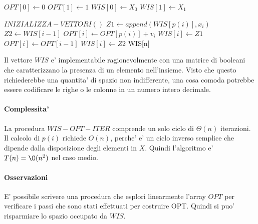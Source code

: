 \begin{algorithm}
    \begin{algorithmic}
            \State $OPT[0] \gets 0$
            \State $OPT[1] \gets 1$
            \State $WIS[0] \gets X_0$
            \State $WIS[1] \gets X_1$
        \EndProcedure
    \end{algorithmic}
\end{algorithm}

\begin{algorithm}
    \begin{algorithmic}
            \State $INIZIALIZZA-VETTORI()$
                \State $Z1 \gets append(WIS[p(i)], x_i)$
                \State $Z2 \gets WIS[i-1]$
                    \State $OPT[i] \gets OPT[p(i)] + v_i$
                    \State $WIS[i] \gets Z1$
                \Else
                    \State $OPT[i] \gets OPT[i-1]$
                    \State $WIS[i] \gets Z2$
                \EndIf
            \EndFor
            \State \Return WIS[n]
        \EndProcedure
    \end{algorithmic}
\end{algorithm}

Il vettore $WIS$ e' implementabile ragionevolmente con una matrice di booleani che caratterizzano la presenza di un elemento nell'insieme. Visto che questo richiederebbe una quantita' di spazio non indifferente, una cosa comoda potrebbe essere codificare le righe o le colonne in un numero intero decimale.

\paragraph{Complessita'}

La procedura $WIS-OPT-ITER$ comprende un solo ciclo di $\Theta(n)$ iterazioni.
Il calcolo di $p(i)$ richiede $O(n)$, perche' e' un ciclo inverso semplice che dipende dalla disposizione degli elementi in $X$.
Quindi l'algoritmo e' $T(n) = \O(n^2)$ nel caso medio.

\paragraph{Osservazioni}

E' possibile scrivere una procedura che esplori linearmente l'array $OPT$ per verificare i passi che sono stati effettuati per costruire OPT. Quindi si puo' risparmiare lo spazio occupato da $WIS$.
